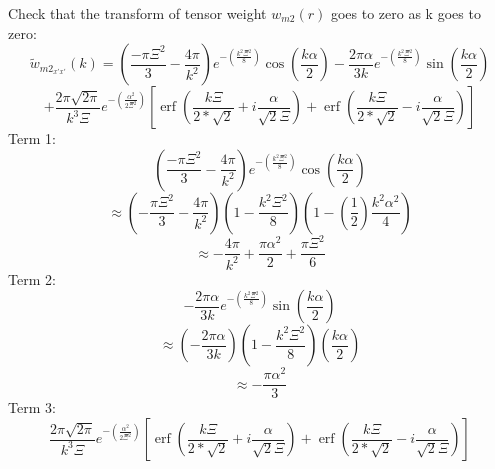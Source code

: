 \documentclass[12pt]{article}
\begin{document}
\[{}\]
\noindent Check that the transform of tensor weight ${w}_{m2}(r)$ goes to zero as k goes to zero:
\begin{displaymath}{\widetilde{w}_{{m2}_{x'x'}}(k)=\left(\frac{-\pi\Xi^2}{3}-\frac{4\pi}{k^2}\right)e^{-\left(\frac{k^2\Xi^2}{8}\right)}\cos(\frac{k\alpha}{2})-\frac{2\pi\alpha}{3k}e^{-\left(\frac{k^2\Xi^2}{8}\right)}\sin(\frac{k\alpha}{2})}\end{displaymath} 
\begin{equation}{+\frac{2\pi\sqrt{2\pi}}{k^3\Xi}e^{-\left(\frac{\alpha^2}{2\Xi^2}\right)}\left[\operatorname{erf}\left(\frac{k\Xi}{2*\sqrt{2}}+i\frac{\alpha}{\sqrt{2}\Xi}\right)+\operatorname{erf}\left(\frac{k\Xi}{2*\sqrt{2}}-i\frac{\alpha}{\sqrt{2}\Xi}\right)\right]}\end{equation}
\[{}\]
Term 1: 
\begin{equation}{\left(\frac{-\pi\Xi^2}{3}-\frac{4\pi}{k^2}\right)e^{-\left(\frac{k^2\Xi^2}{8}\right)}\cos(\frac{k\alpha}{2})}\end{equation}
\begin{displaymath}{\approx\left(-\frac{\pi\Xi^2}{3}-\frac{4\pi}{k^2}\right)\left(1-\frac{k^2\Xi^2}{8}\right)\left(1-\left(\frac{1}{2}\right)\frac{k^2\alpha^2}{4}\right)}\end{displaymath} 
\begin{displaymath}{\approx-\frac{4\pi}{k^2}+\frac{\pi\alpha^2}{2}+\frac{\pi\Xi^2}{6}}\end{displaymath} 
\color{black}
Term 2:
\begin{equation}{-\frac{2\pi\alpha}{3k}e^{-\left(\frac{k^2\Xi^2}{8}\right)}\sin(\frac{k\alpha}{2})}\end{equation} 
\begin{displaymath}{\approx\left(-\frac{2\pi\alpha}{3k}\right)\left(1-\frac{k^2\Xi^2}{8}\right)\left(\frac{k\alpha}{2}\right)}\end{displaymath} 
\begin{displaymath}{\approx}-\frac{\pi\alpha^2}{3}\end{displaymath}
\color{black} 
Term 3:
\begin{equation}{\frac{2\pi\sqrt{2\pi}}{k^3\Xi}e^{-\left(\frac{\alpha^2}{2\Xi^2}\right)}\left[\operatorname{erf}\left(\frac{k\Xi}{2*\sqrt{2}}+i\frac{\alpha}{\sqrt{2}\Xi}\right)+\operatorname{erf}\left(\frac{k\Xi}{2*\sqrt{2}}-i\frac{\alpha}{\sqrt{2}\Xi}\right)\right]}\end{equation}
\end{document}
